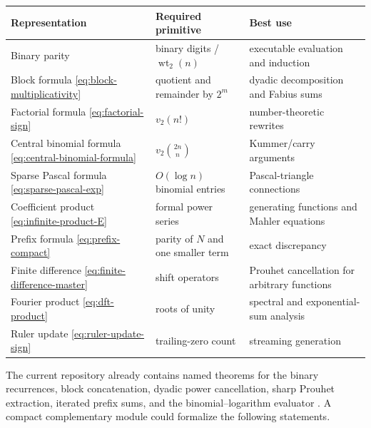 \documentclass[11pt,oneside]{article}
\theoremstyle{definition}
\theoremstyle{remark}
\newcommand{\wt}{\operatorname{wt}_2}
\newcommand{\vtwo}{v_2}
\begin{document}
\begin{center}
\begin{tabularx}{\textwidth}{@{}>{\raggedright\arraybackslash}p{}
>{\raggedright\arraybackslash}p{}X@{}}
\toprule
Representation & Required primitive & Best use\\
\midrule
Binary parity & binary digits / \(\wt(n)\) & executable evaluation and induction\\
Block formula \eqref{eq:block-multiplicativity} & quotient and remainder by \(2^m\) & dyadic decomposition and Fabius sums\\
Factorial formula \eqref{eq:factorial-sign} & \(\vtwo(n!)\) & number-theoretic rewrites\\
Central binomial formula \eqref{eq:central-binomial-formula} & \(\vtwo\binom{2n}{n}\) & Kummer/carry arguments\\
Sparse Pascal formula \eqref{eq:sparse-pascal-exp} & \(O(\log n)\) binomial entries & Pascal-triangle connections\\
Coefficient product \eqref{eq:infinite-product-E} & formal power series & generating functions and Mahler equations\\
Prefix formula \eqref{eq:prefix-compact} & parity of \(N\) and one smaller term & exact discrepancy\\
Finite difference \eqref{eq:finite-difference-master} & shift operators & Prouhet cancellation for arbitrary functions\\
Fourier product \eqref{eq:dft-product} & roots of unity & spectral and exponential-sum analysis\\
Ruler update \eqref{eq:ruler-update-sign} & trailing-zero count & streaming generation\\
\bottomrule
\end{tabularx}
\end{center}

The current repository already contains named theorems for the binary
recurrences, block concatenation, dyadic power cancellation, sharp Prouhet
extraction, iterated prefix sums, and the binomial--logarithm evaluator
\cite{proveit}.  A compact complementary module could formalize the following
statements.
\end{document}
